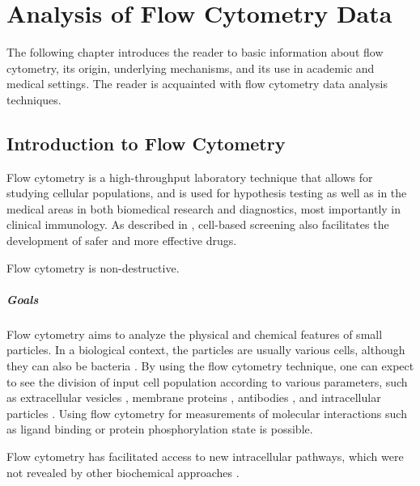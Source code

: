 \chapter{Analysis of Flow Cytometry Data}
\label{chap:two}
The following chapter introduces the reader to basic information about flow cytometry, its origin, underlying mechanisms, and its use in academic and medical settings. The reader is acquainted with flow cytometry data analysis techniques. 

\section{Introduction to Flow Cytometry}
\label{sec:introtoflow}
Flow cytometry is a high-throughput laboratory technique that allows for studying cellular populations, and is used for hypothesis testing as well as in the medical areas in both biomedical research and diagnostics, most importantly in clinical immunology. As described in \cite{black2011cell}, cell-based screening also facilitates the development of safer and more effective drugs. 

Flow cytometry is non-destructive.

\paragraph{Goals}
\label{sec:flowgoals}
Flow cytometry aims to analyze the physical and chemical features of small particles. In a biological context, the particles are usually various cells, although they can also be bacteria \citep{steen2000flow, nebe2000analysis}. 
By using the flow cytometry technique, one can expect to see the division of input cell population according to various parameters, such as extracellular vesicles \citep{nolan2015flow}, membrane proteins \citep{schmitz2021bimolecular}, antibodies \citep{kalina2020relevance, hall1996use}, and intracellular particles \citep{pirone2021three, wronska2022intracellular}. Using flow cytometry for measurements of molecular interactions such as ligand binding \citep{nolan1998emergence} or protein phosphorylation state \citep{perez2002simultaneous} is possible.

Flow cytometry has facilitated access to new intracellular pathways, which were not revealed by other biochemical approaches \citep{sachs2005causal}.

